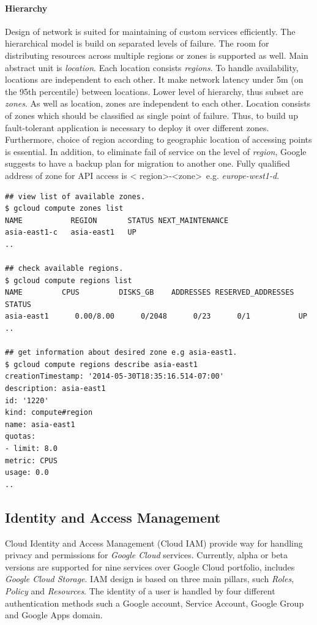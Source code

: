 \documentclass[a4paper,12pt,oneside]{report}
\begin{document}
	\paragraph*{Hierarchy}
	Design of network is suited for maintaining  of custom services efficiently. The
	hierarchical model is build on separated
	levels of failure.  The room for distributing resources across multiple regions
	or zones is supported as well. Main abstract unit is \textit{location}. Each
	location consists \textit{regions}. To handle availability, locations are
	independent to each other. It make  
	network latency under 5m (on the 95th percentile) between locations. Lower
	level of hierarchy, thus subset are \textit{zones}. As well as location, 
	zones are independent to each other. Location consists of zones which should be
	classified as single point of failure. Thus, 
	to build up fault-tolerant application is necessary to deploy it over different
	zones. Furthermore, choice of region according 
	to geographic location of accessing points is essential. In addition, to
	eliminate fail of service on the level of \textit{region}, 
	Google suggests to have a backup plan for migration to another one. Fully
	qualified address of zone   for API access is \textless 
	region\textgreater-\textless zone\textgreater \ e.g. \textit{europe-west1-d}. 
	
	
	\begin{footnotesize}
		\begin{lstlisting}[style=mybash]
## view list of available zones.
$ gcloud compute zones list
NAME           REGION       STATUS NEXT_MAINTENANCE 
asia-east1-c   asia-east1   UP
..

## check available regions.
$ gcloud compute regions list
NAME         CPUS         DISKS_GB    ADDRESSES RESERVED_ADDRESSES STATUS 
asia-east1      0.00/8.00      0/2048      0/23      0/1           UP
..

## get information about desired zone e.g asia-east1.
$ gcloud compute regions describe asia-east1
creationTimestamp: '2014-05-30T18:35:16.514-07:00'
description: asia-east1
id: '1220'
kind: compute#region
name: asia-east1
quotas:
- limit: 8.0
metric: CPUS
usage: 0.0
..
		\end{lstlisting}\end{footnotesize}
	
	
	
	
	
	\subsection{Identity and Access Management}
	Cloud Identity and Access Management (Cloud IAM) provide way for handling privacy
	and permissions for \textit{Google Cloud} services. Currently, alpha  or beta
	versions are 
	supported for nine services over Google Cloud portfolio, 
	includes \textit{Google Cloud Storage}. IAM design is based on three main
	pillars, 
	such \textit{Roles}, \textit{Policy} and \textit{Resources}. The 
	identity of a user is handled by four different authentication methods such a
	Google 
	account, Service Account, Google Group and Google Apps domain.
	
\end{document}
